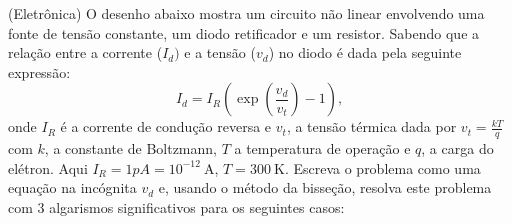 \begin{exer}(Eletrônica)\label{prob_diodo} O desenho abaixo mostra um circuito não linear envolvendo uma fonte de tensão constante, um diodo retificador e um resistor. Sabendo que a relação entre a corrente ($I_d)$ e a tensão ($v_d$) no diodo é dada pela seguinte expressão:
  \begin{equation}
    I_d=I_R\left(\exp\left(\frac{v_d}{v_t}\right)-1\right),
  \end{equation}
onde $I_R$ é a corrente de condução reversa e $v_t$, a tensão térmica dada por $v_t=\frac{kT}{q}$ com $k$, a constante de Boltzmann, $T$ a temperatura de operação e $q$, a carga do elétron. Aqui  $I_R=1pA=10^{-12}~\mbox{A}$, $T=300~\mbox{K}$. Escreva o problema como uma equação na incógnita $v_d$ e, usando o método da bisseção, resolva este problema com 3 algarismos significativos para os seguintes casos:
\end{exer}
